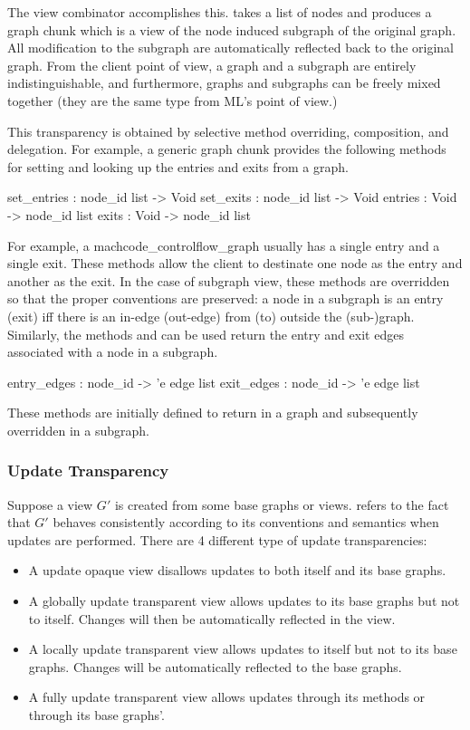 The  view combinator accomplishes this.  
takes a list of nodes and produces a graph chunk which is a view of the
node induced subgraph of the original graph.
All modification to the subgraph are automatically
reflected back to the original graph.  From the client point of view,
a graph and a subgraph are entirely indistinguishable, and furthermore,
graphs and subgraphs can be freely mixed together (they are the same
type from ML's point of view.)

This transparency is obtained by selective method overriding, composition,
and delegation.  For example, a generic graph chunk provides the
following methods for setting and looking up the entries and exits
from a graph.
\begin{SML}
   set_entries  : node_id list -> Void
   set_exits    : node_id list -> Void
   entries      : Void -> node_id list
   exits        : Void -> node_id list
\end{SML}

For example, a machcode_controlflow_graph usually has a single entry and a single exit.
These methods allow the client to destinate one node as the
entry and another as
the exit.  In the case of subgraph view, these methods are overridden so
that the proper conventions are preserved:
a node in a subgraph is an entry (exit) iff there is an in-edge (out-edge)
from (to) outside the (sub-)graph.
Similarly, the methods  and  can be used
return the entry and exit edges associated with a node in a subgraph.
\begin{SML}
   entry_edges  : node_id -> 'e edge list
   exit_edges   : node_id -> 'e edge list
\end{SML}
These methods are initially defined to return \sml{[]} in a graph and
subsequently overridden in a subgraph.

\subsubsection{ Update Transparency }

Suppose a view $G'$ is created from some base graphs or views.
 refers to the fact that 
$G'$ behaves
consistently according to its conventions and semantics when updates
are performed. There are 4 different type of update transparencies:
\begin{itemize}
\item{}  A update opaque view disallows updates to both
itself and its base graphs.
\item{} A globally update transparent
view allows updates to its base graphs but not to itself.  Changes
will then be automatically reflected in the view.
\item{}  A locally update transparent
view allows updates to itself but not to its base graphs.
Changes will be automatically reflected to the base graphs.
\item{}  A fully update transparent
view allows updates through its methods or through its base
graphs'.  
\end{itemize}

